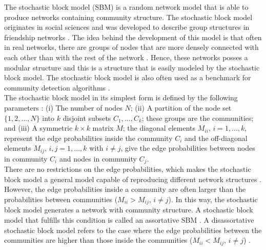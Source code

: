 \documentclass[11 pt , letterpaper , twoside , openright]{book}
\begin{document}
The stochastic block model (SBM) is a random network model that is able to produce networks containing community structure. The stochastic block model originates in social sciences and was developed to describe group structures in friendship networks \cite{Funke2019}. The idea behind the development of this model is that often in real networks, there are groups of nodes that are more densely connected with each other than with the rest of the network \cite{F.Costa2007}. Hence, these networks posses a modular structure and this is a structure that is easily modeled by the stochastic block model. The stochastic block model is also often used as a benchmark for community detection algorithms \cite{Abbe2018}.\\
\newline
The stochastic block model in its simplest form is defined by the following parameters \cite{Clauset2017}: (i) The number of nodes $N$; (ii) A partition of the node set $\{1, 2, ..., N\}$ into $k$ disjoint subsets $C_1, ..., C_k$; these groups are the communities; and (iii) A symmetric $k\times k$ matrix $M$; the diagonal elements $M_{ii}$, $i = 1, ..., k$, represent the edge probabilities inside the community $C_i$ and the off-diagonal elements $M_{ij}$, $i, j = 1, ..., k$ with $i \neq j$, give the edge probabilities between nodes in community $C_i$ and nodes in community $C_j$.\\
\newline
There are no restrictions on the edge probabilities, which makes the stochastic block model a general model capable of reproducing different network structures \cite{Karrer2011}. However, the edge probabilities inside a community are often larger than the probabilities between communities ($M_{ii} > M_{ij}$, $i \neq j$). In this way, the stochastic block model generates a network with community structure. A stochastic block model that fulfills this condition is called an assortative SBM \cite{Lee2019}. A disassortative stochastic block model refers to the case where the edge probabilities between the communities are higher than those inside the communities ($M_{ii} < M_{ij}$, $i \neq j$) \cite{Gribel2020}.\\
\newline
\end{document}

